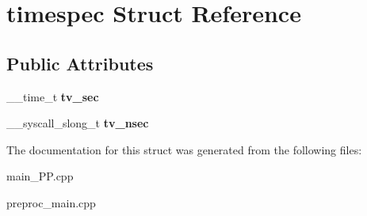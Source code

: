 \hypertarget{structtimespec}{\section{timespec Struct Reference}
\label{structtimespec}
}
\subsection*{Public Attributes}
\begin{DoxyCompactItemize}
\item 
\hypertarget{structtimespec_a589c1cbd315a9dd339f4fff9dfae15be}{\+\_\+\+\_\+time\+\_\+t {\bfseries tv\+\_\+sec}}\label{structtimespec_a589c1cbd315a9dd339f4fff9dfae15be}

\item 
\hypertarget{structtimespec_a10432d0e3ad030b10bcf6a60f9636d2b}{\+\_\+\+\_\+syscall\+\_\+slong\+\_\+t {\bfseries tv\+\_\+nsec}}\label{structtimespec_a10432d0e3ad030b10bcf6a60f9636d2b}

\end{DoxyCompactItemize}


The documentation for this struct was generated from the following files\+:\begin{DoxyCompactItemize}
\item 
main\+\_\+\+P\+P.\+cpp\item 
preproc\+\_\+main.\+cpp\end{DoxyCompactItemize}
